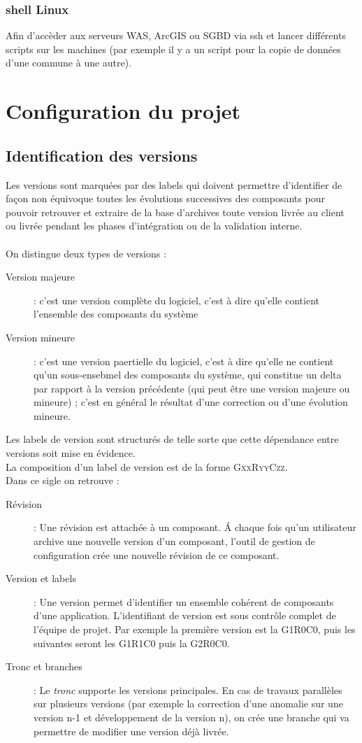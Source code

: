 \subsection{shell Linux} Afin d'accèder aux serveurs WAS, ArcGIS ou SGBD via ssh et lancer différents scripts sur les machines (par exemple il y a un script pour la copie de données d'une commune à une autre).

\chapter{Configuration du projet}
\section{Identification des versions}
\label{versionning}
Les versions sont marquées par des labels qui doivent permettre d'identifier de façon non équivoque toutes les évolutions successives des composants pour pouvoir retrouver et extraire de la base d'archives toute version livrée au client ou livrée pendant les phases d'intégration ou de la validation interne.
\\\\
On distingue deux types de versions :
\begin{description}
	\item[Version majeure] : c'est une version complète du logiciel, c'est à dire qu'elle contient l'ensemble des composants du système
	\item[Version mineure] : c'est une version paertielle du logiciel, c'est à dire qu'elle ne contient qu'un sous-ensebmel des composants du système, qui constitue un delta par rapport à la version précédente
	(qui peut être une version majeure ou mineure) ; c'est en général le résultat d'une correction ou d'une évolution mineure.
\end{description}
Les labels de version sont structurés de telle sorte que cette dépendance entre versions soit mise en évidence.
\\La composition d'un label de version est de la forme \textsc{GxxRyyCzz}.
\\Dans ce sigle on retrouve :
\begin{description}
	\item[Révision] : Une révision est attachée à un composant. \'A chaque fois qu'un utilisateur archive une nouvelle version d'un composant, l'outil de gestion de configuration crée une nouvelle révision de ce composant.
	\item[Version et labels] : Une version permet d'identifier un ensemble cohérent de composants d'une application. L'identifiant de version est sous contrôle complet de l'équipe de projet. Par exemple la première version est la G1R0C0, puis les suivantes seront les
	G1R1C0 puis la G2R0C0.
	\item[Tronc et branches] : Le \textit{tronc} supporte les versions principales. En cas de travaux parallèles sur plusieurs versions (par exemple la correction d'une anomalie sur une version n-1 et développement de la version n), on crée une branche qui va permettre de modifier une version déjà livrée.
	\\
\end{description}

